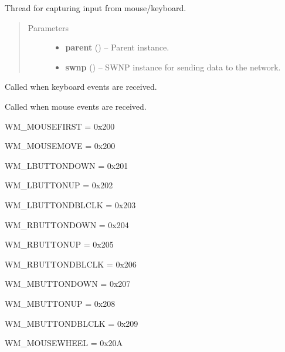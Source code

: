 \documentclass[letterpaper,10pt,english]{sphinxmanual}
\begin{document}
\begin{fulllineitems}
\label{wos:wos.INPUT_CAPTURE}
Thread for capturing input from mouse/keyboard.
\begin{quote}\begin{description}
\item[{Parameters}] \leavevmode\begin{itemize}
\item {} 
\textbf{parent} ({\hyperref[wos:wos.GUI]{}}) -- Parent instance.

\item {} 
\textbf{swnp} ({\hyperref[swnp:swnp.SWNP]{}}) -- SWNP instance for sending data to the network.

\end{itemize}

\end{description}\end{quote}

\begin{fulllineitems}
\label{wos:wos.INPUT_CAPTURE.OnKeyboardEvent}
Called when keyboard events are received.

\end{fulllineitems}


\begin{fulllineitems}
\label{wos:wos.INPUT_CAPTURE.OnMouseEvent}
Called when mouse events are received.

WM\_MOUSEFIRST = 0x200

WM\_MOUSEMOVE = 0x200

WM\_LBUTTONDOWN = 0x201

WM\_LBUTTONUP = 0x202

WM\_LBUTTONDBLCLK = 0x203

WM\_RBUTTONDOWN = 0x204

WM\_RBUTTONUP = 0x205

WM\_RBUTTONDBLCLK = 0x206

WM\_MBUTTONDOWN = 0x207

WM\_MBUTTONUP = 0x208

WM\_MBUTTONDBLCLK = 0x209

WM\_MOUSEWHEEL = 0x20A


\end{fulllineitems}
\end{fulllineitems}
\end{document}
